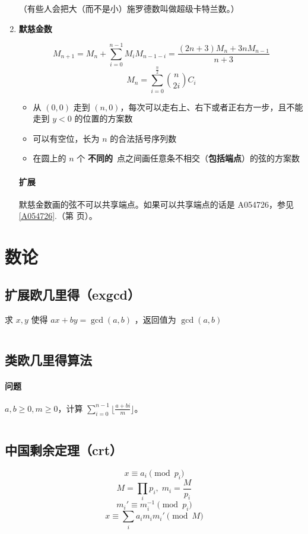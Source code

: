 \documentclass[a4paper, twoside]{article}
\newcommand\detailedref[1]{\ref{#1}.\nameref{#1}（第 \pageref{#1} 页）}
\begin{document}
\begin{enumerate}
        （有些人会把大（而不是小）施罗德数叫做超级卡特兰数。）
        
        \item \textbf{默慈金数}
        
        $$ M_{n + 1} = M_n + \sum_{i = 0} ^ {n - 1} M_i M_{n - 1 - i} = \frac {(2n + 3)M_n + 3n M_{n - 1}} {n + 3} $$
        $$ M_n = \sum_{i = 0} ^ {\frac {n}{2}} \binom{n}{2i} C_i $$
        
        \begin{itemize}
            \item 从 $(0, 0)$ 走到 $(n, 0)$，每次可以走右上、右下或者正右方一步，且不能走到 $y<0$ 的位置的方案数
            \item 可以有空位，长为 $n$ 的合法括号序列数
            \item 在圆上的 $n$ 个 \textbf{不同的}\ 点之间画任意条不相交（\textbf{包括端点}）的弦的方案数
        \end{itemize}
        
        \paragraph{扩展} 默慈金数画的弦不可以共享端点。如果可以共享端点的话是 A054726，参见 \detailedref{A054726}。
        
    \end{enumerate}
        
    
\newpage
\section{数论}
\subsection{扩展欧几里得（exgcd）}
求 $x, y$ 使得 $ax+by=\gcd(a, b)$ ，返回值为 $\gcd(a, b)$
\inputminted{cpp}{../src/数论/扩展欧几里得（exgcd）.cpp}

\subsection{类欧几里得算法}
\paragraph{问题} $a, b \geq 0, m \ge 0$，计算 $\sum\limits_{i=0}^{n-1} \lfloor \frac{a+bi}{m} \rfloor$。
\inputminted{cpp}{../src/数论/类欧几里得算法.cpp}

\subsection{中国剩余定理（crt）}
$$ x \equiv a_i \pmod {p_i} $$
$$ M = \prod_i p_i,\; m_i = \frac M {p_i} $$
$$ m_i' \equiv m_i^{-1} \pmod {p_i} $$
$$ x \equiv \sum_{i} a_i m_i m_i' \pmod M $$
\inputminted{cpp}{../src/数论/中国剩余定理（crt）.cpp}
\end{document}
